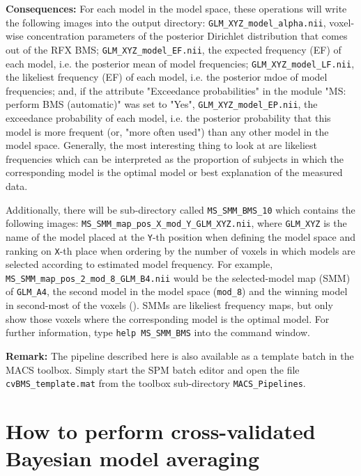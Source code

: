 \documentclass[a4paper,12pt]{article}
\begin{document}
\textbf{Consequences:} For each model in the model space, these operations will write the following images into the output directory: \texttt{GLM\_XYZ\_model\_alpha.nii}, voxel-wise concentration parameters of the posterior Dirichlet distribution that comes out of the RFX BMS; \texttt{GLM\_XYZ\_model\_EF.nii}, the expected frequency (EF) of each model, i.e. the posterior mean of model frequencies; \texttt{GLM\_XYZ\_model\_LF.nii}, the likeliest frequency (EF) of each model, i.e. the posterior mdoe of model frequencies; and, if the attribute "Exceedance probabilities" in the module "MS: perform BMS (automatic)" was set to "Yes", \texttt{GLM\_XYZ\_model\_EP.nii}, the exceedance probability of each model, i.e. the posterior probability that this model is more frequent (or, "more often used") than any other model in the model space. Generally, the most interesting thing to look at are likeliest frequencies which can be interpreted as the proportion of subjects in which the corresponding model is the optimal model or best explanation of the measured data.

Additionally, there will be sub-directory called \texttt{MS\_SMM\_BMS\_10} which contains the following images: \texttt{MS\_SMM\_map\_pos\_X\_mod\_Y\_GLM\_XYZ.nii}, where \texttt{GLM\_XYZ} is the name of the model placed at the \texttt{Y}-th position when defining the model space and ranking on \texttt{X}-th place when ordering by the number of voxels in which models are selected according to estimated model frequency. For example, \texttt{MS\_SMM\_map\_pos\_2\_mod\_8\_GLM\_B4.nii} would be the selected-model map (SMM) of \texttt{GLM\_A4}, the second model in the model space (\texttt{mod\_8}) and the winning model in second-most of the voxels (). SMMs are likeliest frequency maps, but only show those voxels where the corresponding model is the optimal model. For further information, type \texttt{help MS\_SMM\_BMS} into the command window.

\textbf{Remark:} The pipeline described here is also available as a template batch in the MACS toolbox. Simply start the SPM batch editor and open the file \texttt{cvBMS\_template.mat} from the toolbox sub-directory \texttt{MACS\_Pipelines}.



\pagebreak
\section[How to perform cross-validated Bayesian model averaging]{How to perform cross-validated \\ Bayesian model averaging} \label{sec:cvBMA}
\end{document}
